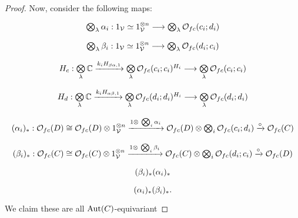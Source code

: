\documentclass[a4paper,10pt
,draft
]{article}%
\renewcommand{\1}{\eta}%
\begin{document}
\begin{proof}
      Now, consider the following maps:
      \begin{equation}
            \begin{tikzcd}[row sep = tiny]
                  \bigotimes_\lambda \alpha_i: 1_\V \simeq 1_\V^{\otimes n} \longrightarrow \bigotimes_\lambda \O_{f c}(c_i;d_i)
                  \\ %
                  \bigotimes_\lambda \beta_i: 1_\V \simeq 1_\V^{\otimes n} \longrightarrow \bigotimes_\lambda \O_{f c}(d_i;c_i)
                  \\ %
                  H_c: \bigotimes\limits_\lambda \mathbb C \xrightarrow{k_i H_{\beta\alpha,1}}
                  \bigotimes\limits_\lambda \O_{f c}(c_i;c_i)^{H_i} \longrightarrow
                  \bigotimes\limits_\lambda \O_{f c}(c_i;c_i)
                  \\ %
                  H_d: \bigotimes\limits_\lambda \mathbb C \xrightarrow{k_i H_{\alpha\beta,1}}
                  \bigotimes\limits_\lambda \O_{f c}(d_i;d_i)^{H_i} \longrightarrow
                  \bigotimes\limits_\lambda \O_{f c}(d_i;d_i)
                  \\ %
                  (\alpha_i)_{\**} : 
                  \O_{f c}(D)
                  \cong
                  \O_{f c}(D) \otimes 1_\V^{\otimes n} \xrightarrow{1 \otimes\ \bigotimes_i \alpha_i}
                  \O_{f c}(D) \otimes \bigotimes_i \O_{f c}(c_i;d_i) \xrightarrow{\circ}
                  \O_{f c}(C)
                  \\ %
                  (\beta_i)_{\**} :
                  \O_{f c}(C)
                  \cong
                  \O_{f c}(C) \otimes 1_\V^{\otimes n} \xrightarrow{1 \otimes\ \bigotimes_i \beta_i}
                  \O_{f c}(C) \otimes \bigotimes_i \O_{f c}(d_i;c_i) \xrightarrow{\circ}
                  \O_{f c}(D)
                  \\ %
                  (\beta_i)_{\**}(\alpha_i)_{\**}
                  \\ %
                  (\alpha_i)_{\**}(\beta_i)_{\**}.
            \end{tikzcd}
      \end{equation}
      We claim these are all $\operatorname{Aut}(C)$-equivariant

\end{proof}
\end{document}
